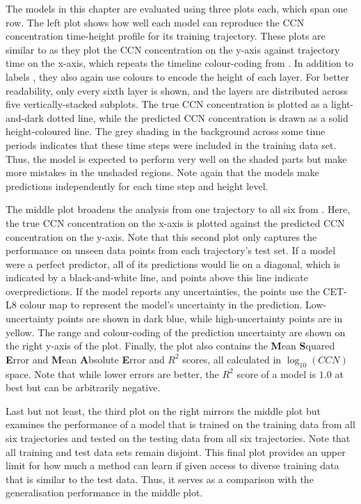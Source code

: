 \newpar The models in this chapter are evaluated using three plots each, which span one row. The left plot shows how well each model can reproduce the CCN concentration time-height profile for its training trajectory. These plots are similar to  as they plot the CCN concentration on the y-axis against trajectory time on the x-axis, which repeats the timeline colour-coding from . In addition to labels \cite{mpl-label-lines-2022}, they also again use colours to encode the height of each layer. For better readability, only every sixth layer is shown, and the layers are distributed across five vertically-stacked subplots. The true CCN concentration is plotted as a light-and-dark dotted line, while the predicted CCN concentration is drawn as a solid height-coloured line. The grey shading in the background across some time periods indicates that these time steps were included in the training data set. Thus, the model is expected to perform very well on the shaded parts but make more mistakes in the unshaded regions. Note again that the models make predictions independently for each time step and height level.

The middle plot broadens the analysis from one trajectory to all six from . Here, the true CCN concentration on the x-axis is plotted against the predicted CCN concentration on the y-axis. Note that this second plot only captures the performance on unseen data points from each trajectory's test set. If a model were a perfect predictor, all of its predictions would lie on a diagonal, which is indicated by a black-and-white line, and points above this line indicate overpredictions. If the model reports any uncertainties, the points use the CET-L8 colour map \cite{color-cet-2015, color-cet-2023} to represent the model's uncertainty in the prediction. Low-uncertainty points are shown in dark blue, while high-uncertainty points are in yellow. The range and colour-coding of the prediction uncertainty are shown on the right y-axis of the plot. Finally, the plot also contains the \textbf{M}ean \textbf{S}quared \textbf{E}rror and \textbf{M}ean \textbf{A}bsolute \textbf{E}rror and $R^2$ scores, all calculated in $\log_{10}(CCN)$ space. Note that while lower errors are better, the $R^2$ score of a model is $1.0$ at best but can be arbitrarily negative.

Last but not least, the third plot on the right mirrors the middle plot but examines the performance of a model that is trained on the training data from all six trajectories and tested on the testing data from all six trajectories. Note that all training and test data sets remain disjoint. This final plot provides an upper limit for how much a method can learn if given access to diverse training data that is similar to the test data. Thus, it serves as a comparison with the generalisation performance in the middle plot.

